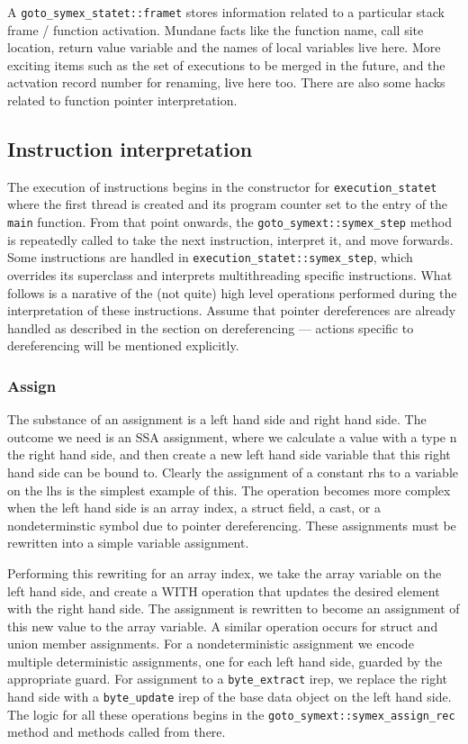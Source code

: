 \documentclass{article}
\begin{document}
A \texttt{goto\_symex\_statet::framet} stores information related to a
particular stack frame / function activation. Mundane facts like the function
name, call site location, return value variable and the names of local variables
live here. More exciting items such as the set of executions to be merged in
the future, and the actvation record number for renaming, live here too.
There are also some hacks related to function pointer interpretation.

\subsection{Instruction interpretation}

The execution of instructions begins in the constructor for
\texttt{execution\_statet} where the first thread is created and its program
counter set to the entry of the \texttt{main} function. From that point
onwards, the \texttt{goto\_symext::symex\_step} method is repeatedly called
to take the next instruction, interpret it, and move forwards. Some
instructions are handled in \texttt{execution\_statet::symex\_step},
which overrides its superclass and interprets multithreading specific
instructions. What follows is a narative of the (not quite) high level
operations performed during the interpretation of these instructions. Assume
that pointer dereferences are already handled as described in the section
on dereferencing --- actions specific to dereferencing will be mentioned
explicitly.

\subsubsection{Assign}

The substance of an assignment is a left hand side and right hand side. The
outcome we need is an SSA assignment, where we calculate a value with a type
n the right hand side, and then create a new left hand side variable that this
right hand side can be bound to. Clearly the assignment of a constant rhs to
a variable on the lhs is the simplest example of this. The operation becomes
more complex when the left hand side is an array index, a struct field,
a cast, or a nondeterminstic symbol due to pointer dereferencing. These
assignments must be rewritten into a simple variable assignment.

Performing this rewriting for an array index, we take the array variable
on the left hand side, and create a WITH operation that updates the desired
element with the right hand side. The assignment is rewritten to become an
assignment of this new value to the array variable. A similar operation
occurs for struct and union member assignments. For a nondeterministic
assignment we encode multiple deterministic assignments, one for each left
hand side, guarded by the appropriate guard. For assignment to a
\texttt{byte\_extract} irep, we replace the right hand side with a
\texttt{byte\_update} irep of the base data object on the left hand side.
The logic for all these operations begins in the
\texttt{goto\_symext::symex\_assign\_rec} method and methods called from there.
\end{document}
